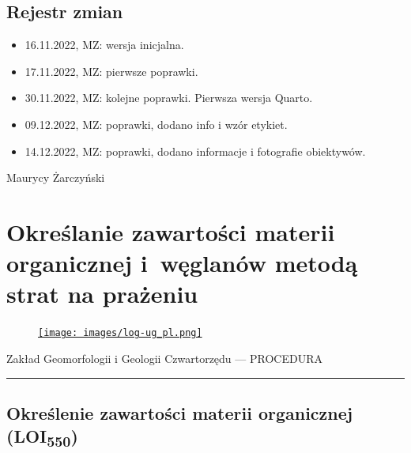 \documentclass[
  letterpaper,
  DIV=11,
  numbers=noendperiod]{scrreprt}
\providecommand{\tightlist}{%
  \setlength{\itemsep}{0pt}\setlength{\parskip}{0pt}}\usepackage{longtable,booktabs,array}
\begin{document}
\newpage{}

\hypertarget{rejestr-zmian-9}{%
\section{Rejestr zmian}\label{rejestr-zmian-9}}

\begin{itemize}
\tightlist
\item
  16.11.2022, MZ: wersja inicjalna.
\item
  17.11.2022, MZ: pierwsze poprawki.
\item
  30.11.2022, MZ: kolejne poprawki. Pierwsza wersja Quarto.
\item
  09.12.2022, MZ: poprawki, dodano info i wzór etykiet.
\item
  14.12.2022, MZ: poprawki, dodano informacje i fotografie obiektywów.
\end{itemize}

Maurycy Żarczyński

\hypertarget{okreux15blanie-zawartoux15bci-materii-organicznej-i-wux119glanuxf3w-metodux105-strat-na-praux17ceniu}{%
\chapter{Określanie zawartości materii organicznej i~węglanów metodą
strat na
prażeniu}\label{okreux15blanie-zawartoux15bci-materii-organicznej-i-wux119glanuxf3w-metodux105-strat-na-praux17ceniu}}

\begin{figure}

\href{https://geomorfologia.ug.edu.pl}{\texttt{[image: images/log-ug\_pl.png]}}

\end{figure}

Zakład Geomorfologii i Geologii Czwartorzędu --- PROCEDURA

\begin{center}\rule{0.5\linewidth}{0.5pt}\end{center}

\hypertarget{okreux15blenie-zawartoux15bci-materii-organicznej-loi550}{%
\section{\texorpdfstring{Określenie zawartości materii organicznej
(LOI\textsubscript{550})}{Określenie zawartości materii organicznej (LOI550)}}\label{okreux15blenie-zawartoux15bci-materii-organicznej-loi550}}
\end{document}
